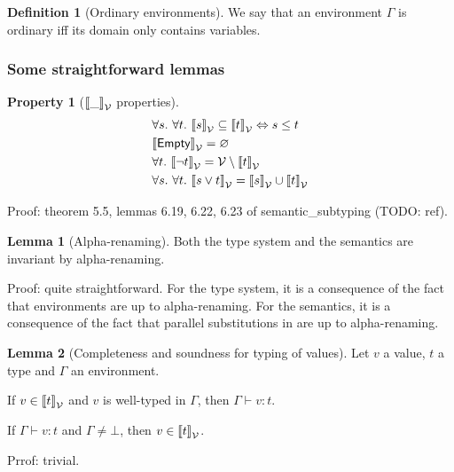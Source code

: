 \documentclass[a4paper]{article}
\theoremstyle{definition}
\newtheorem{lemma}{Lemma}
\newtheorem{definition}{Definition}
\newtheorem{property}{Property}
\begin{document}
      \begin{definition}[Ordinary environments]
        We say that an environment $\Gamma$ is ordinary iff its domain only contains variables.
      \end{definition}

    \subsubsection{Some straightforward lemmas}

        \begin{property}[${\llbracket \_ \rrbracket}_{\mathcal{V}}$ properties]
          \begin{align*}
            &\forall s.\ \forall t.\ {\llbracket s \rrbracket}_{\mathcal{V}} \subseteq {\llbracket t \rrbracket}_{\mathcal{V}} \Leftrightarrow s \leq t\\
            &{\llbracket \textsf{Empty} \rrbracket}_{\mathcal{V}} = \varnothing\\
            &\forall t.\ {\llbracket \neg t \rrbracket}_{\mathcal{V}} = \mathcal{V} \setminus {\llbracket t \rrbracket}_{\mathcal{V}}\\
            &\forall s.\ \forall t.\ {\llbracket s\vee t \rrbracket}_{\mathcal{V}} = {\llbracket s \rrbracket}_{\mathcal{V}} \cup {\llbracket t \rrbracket}_{\mathcal{V}}
          \end{align*}
        \end{property}
        Proof: theorem 5.5, lemmas 6.19, 6.22, 6.23 of semantic\_subtyping (TODO: ref).

        \begin{lemma}[Alpha-renaming]
          Both the type system and the semantics are invariant by alpha-renaming.
        \end{lemma}
        Proof: quite straightforward.
        For the type system, it is a consequence of the fact that environments are up to alpha-renaming.
        For the semantics, it is a consequence of the fact that parallel substitutions in 
        are up to alpha-renaming.

        \begin{lemma}[Completeness and soundness for typing of values]
          Let $v$ a value, $t$ a type and $\Gamma$ an environment.

          If $v \in {\llbracket t \rrbracket}_{\mathcal{V}}$ and $v$ is well-typed in $\Gamma$, then $\Gamma\vdash v:t$.

          If $\Gamma \vdash v:t$ and $\Gamma\neq\bot$, then $v \in {\llbracket t \rrbracket}_{\mathcal{V}}$.
        \end{lemma}
        Prrof: trivial.
    
\end{document}
